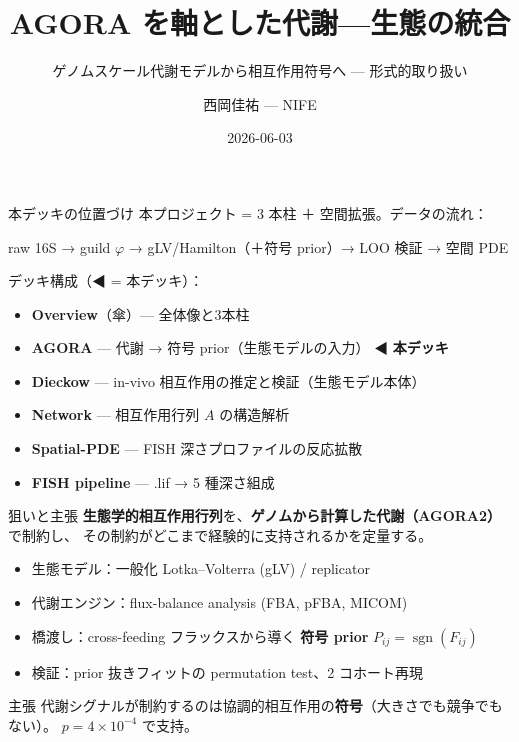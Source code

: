 \documentclass[
  ignorenonframetext,
  aspectratio=169,
]{beamer}
\title{AGORA を軸とした代謝---生態の統合}
\subtitle{ゲノムスケール代謝モデルから相互作用符号へ --- 形式的取り扱い}
\author{西岡佳祐 --- NIFE}
\date{2026-06-03}
\providecommand{\tightlist}{%
  \setlength{\itemsep}{0pt}\setlength{\parskip}{0pt}}
\begin{document}
\frame{\titlepage}

\begin{frame}{本デッキの位置づけ}
\protect\hypertarget{ux672cux30c7ux30c3ux30adux306eux4f4dux7f6eux3065ux3051}{}
本プロジェクト = 3 本柱 ＋ 空間拡張。データの流れ：

raw 16S → guild \(\varphi\) → gLV/Hamilton（＋符号 prior）→ LOO 検証 →
空間 PDE

デッキ構成（◀ = 本デッキ）：

\begin{itemize}
\tightlist
\item
  \textbf{Overview}（傘）--- 全体像と3本柱
\item
  \textbf{AGORA} --- 代謝 → 符号 prior（生態モデルの入力） ◀
  \textbf{本デッキ}
\item
  \textbf{Dieckow} --- in-vivo 相互作用の推定と検証（生態モデル本体）
\item
  \textbf{Network} --- 相互作用行列 \(A\) の構造解析
\item
  \textbf{Spatial-PDE} --- FISH 深さプロファイルの反応拡散
\item
  \textbf{FISH pipeline} --- .lif → 5 種深さ組成
\end{itemize}
\end{frame}

\begin{frame}{狙いと主張}
\protect\hypertarget{ux72d9ux3044ux3068ux4e3bux5f35}{}
\textbf{生態学的相互作用行列}を、\textbf{ゲノムから計算した代謝（AGORA2）}で制約し、
その制約がどこまで経験的に支持されるかを定量する。

\begin{itemize}
\tightlist
\item
  生態モデル：一般化 Lotka--Volterra (gLV) / replicator
\item
  代謝エンジン：flux-balance analysis (FBA, pFBA, MICOM)
\item
  橋渡し：cross-feeding フラックスから導く \textbf{符号 prior}
  \(P_{ij}=\operatorname{sgn}(F_{ij})\)
\item
  検証：prior 抜きフィットの permutation test、2 コホート再現
\end{itemize}

\vspace{0.4em}

\begin{block}{主張}
代謝シグナルが制約するのは協調的相互作用の\textbf{符号}（大きさでも競争でもない）。
\alert{$p=4\times10^{-4}$} で支持。
\end{block}
\end{frame}
\end{document}

